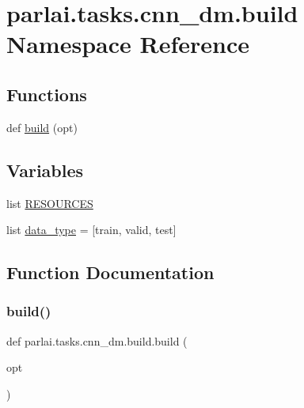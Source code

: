 \hypertarget{namespaceparlai_1_1tasks_1_1cnn__dm_1_1build}{}\section{parlai.\+tasks.\+cnn\+\_\+dm.\+build Namespace Reference}
\label{namespaceparlai_1_1tasks_1_1cnn__dm_1_1build}
\subsection*{Functions}
\begin{DoxyCompactItemize}
\item 
def \hyperlink{namespaceparlai_1_1tasks_1_1cnn__dm_1_1build_ad2c68b11a275c9630ade4d09495b7ece}{build} (opt)
\end{DoxyCompactItemize}
\subsection*{Variables}
\begin{DoxyCompactItemize}
\item 
list \hyperlink{namespaceparlai_1_1tasks_1_1cnn__dm_1_1build_a514281377f21019d941ea7de3eb140bb}{R\+E\+S\+O\+U\+R\+C\+ES}
\item 
list \hyperlink{namespaceparlai_1_1tasks_1_1cnn__dm_1_1build_a0d45a7f80ed5ddcb6c91a6f06fb3ca9f}{data\+\_\+type} = \mbox{[}\textquotesingle{}train\textquotesingle{}, \textquotesingle{}valid\textquotesingle{}, \textquotesingle{}test\textquotesingle{}\mbox{]}
\end{DoxyCompactItemize}


\subsection{Function Documentation}
\mbox{\label{namespaceparlai_1_1tasks_1_1cnn__dm_1_1build_ad2c68b11a275c9630ade4d09495b7ece}} 
\subsubsection{\texorpdfstring{build()}{build()}}
{\footnotesize\ttfamily def parlai.\+tasks.\+cnn\+\_\+dm.\+build.\+build (\begin{DoxyParamCaption}\item[{}]{opt }\end{DoxyParamCaption})}



